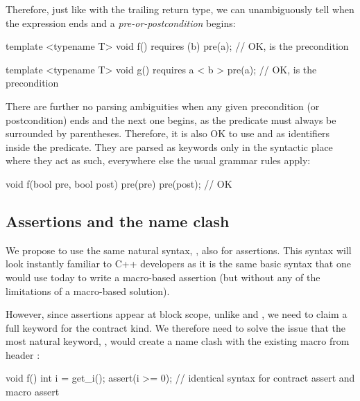 Therefore, just like with the trailing return type, we can unambiguously tell when the expression ends and a \emph{pre-or-postcondition} begins:

\vspace{2mm}
\begin{codeblock}
template <typename T>
void f() requires (b) pre(a);   // OK,  is the precondition

template <typename T>
void g() requires a < b > pre(a);   // OK,  is the precondition
\end{codeblock}
\vspace{2mm}

There are further no parsing ambiguities when any given precondition (or postcondition) ends and the next one begins, as the predicate must always be surrounded by parentheses. Therefore, it is also OK to use  and  as identifiers inside the predicate. They are parsed as keywords only in the syntactic place where they act as such, everywhere else the usual grammar rules apply:

\vspace{2mm}
\begin{codeblock}
void f(bool pre, bool post)
  pre(pre) pre(post);   // OK
\end{codeblock}
\vspace{2mm}

\subsection{Assertions and the  name clash}
\label{subsec:assrt}

We propose to use the same natural syntax, , also for assertions. This syntax will look instantly familiar to C++ developers as it is the same basic syntax that one would use today to write a macro-based assertion (but without any of the limitations of a macro-based solution). 

However, since assertions appear at block scope, unlike  and , we need to claim a full keyword for the contract kind. We therefore need to solve the issue that the most natural keyword, , would create a name clash with the existing  macro from header :

\vspace{2mm}
\begin{codeblock}
void f() {
  int i = get_i();
  assert(i >= 0);  // identical syntax for contract assert and macro assert
}
\end{codeblock}
\vspace{2mm}


